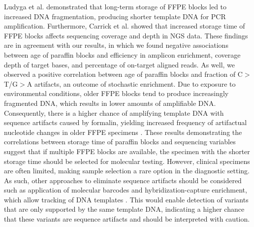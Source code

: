 Ludyga et al. \cite{Ludyga2012} demonstrated that long-term storage of FFPE blocks led to increased DNA fragmentation, producing shorter template DNA for PCR amplification. Furthermore, Carrick et al. \cite{Carrick2015} showed that increased storage time of FFPE blocks affects sequencing coverage and depth in NGS data. These findings are in agreement with our results, in which we found negative associations between age of paraffin blocks and efficiency in amplicon enrichment, coverage depth of target bases, and percentage of on-target aligned reads. As well, we observed a positive correlation between age of paraffin blocks and fraction of C$>$T/G$>$A artifacts, an outcome of stochastic enrichment. Due to exposure to environmental conditions, older FFPE blocks tend to produce increasingly fragmented DNA, which results in lower amounts of amplifiable DNA. Consequently, there is a higher chance of amplifying template DNA with sequence artifacts caused by formalin, yielding increased frequency of artifactual nucleotide changes in older FFPE specimens \cite{Wong2014}. These results demonstrating the correlations between storage time of paraffin blocks and sequencing variables suggest that if multiple FFPE blocks are available, the specimen with the shorter storage time should be selected for molecular testing. However, clinical specimens are often limited, making sample selection a rare option in the diagnostic setting. As such, other approaches to eliminate sequence artifacts should be considered such as application of molecular barcodes and hybridization-capture enrichment, which allow tracking of DNA templates \cite{Eijkelenboom2016, Samorodnitsky2015, Peng2015, Wong2013}. This would enable detection of variants that are only supported by the same template DNA, indicating a higher chance that these variants are sequence artifacts and should be interpreted with caution.

